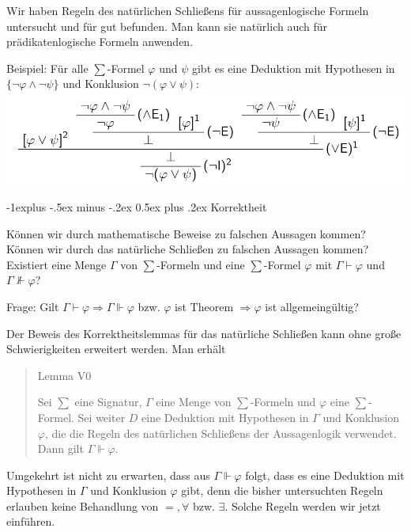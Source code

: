 \documentclass[a4paper]{article}
\makeatletter
\renewcommand{\subsection}{\@startsection{subsection}{2}{0mm}%
                {-1explus -.5ex minus -.2ex}%
                {0.5ex plus .2ex}%
                {\normalfont\normalsize\bfseries}}
\makeatother
\begin{document}
\begin{multicols}{3}
  Wir haben Regeln des natürlichen Schließens für aussagenlogische Formeln
  untersucht und für gut befunden. Man kann sie natürlich auch für
  prädikatenlogische Formeln anwenden.

  Beispiel: Für alle $\sum$-Formel $\varphi$ und $\psi$ gibt es eine
  Deduktion mit Hypothesen in $\{\lnot\varphi\wedge\lnot\psi\}$ und
  Konklusion $\lnot(\varphi\vee\psi)$:
  \includegraphics[width=\linewidth]{Assets/Logik-deduktion-konklusion.png}

  \subsection{Korrektheit}\label{korrektheit-1}

  Können wir durch mathematische Beweise zu falschen Aussagen kommen?
  Können wir durch das natürliche Schließen zu falschen Aussagen kommen?
  Existiert eine Menge $\Gamma$ von $\sum$-Formeln und eine $\sum$-Formel
  $\varphi$ mit $\Gamma\vdash\varphi$ und $\Gamma\not\Vdash\varphi$?

  Frage: Gilt $\Gamma\vdash\varphi\Rightarrow \Gamma\Vdash\varphi$ bzw.
  $\varphi$ ist Theorem $\Rightarrow\varphi$ ist allgemeingültig?

  Der Beweis des Korrektheitslemmas für das natürliche Schließen kann ohne
  große Schwierigkeiten erweitert werden. Man erhält

  \begin{quote}
    Lemma V0

    Sei $\sum$ eine Signatur, $\Gamma$ eine Menge von $\sum$-Formeln und
    $\varphi$ eine $\sum$-Formel. Sei weiter $D$ eine Deduktion mit
    Hypothesen in $\Gamma$ und Konklusion $\varphi$, die die Regeln des
    natürlichen Schließens der Aussagenlogik verwendet. Dann gilt
    $\Gamma\Vdash\varphi$.
  \end{quote}

  Umgekehrt ist nicht zu erwarten, dass aus $\Gamma\Vdash\varphi$ folgt,
  dass es eine Deduktion mit Hypothesen in $\Gamma$ und Konklusion
  $\varphi$ gibt, denn die bisher untersuchten Regeln erlauben keine
  Behandlung von $=,\forall$ bzw. $\exists$. Solche Regeln werden wir
  jetzt einführen.


\end{multicols}
\end{document}
